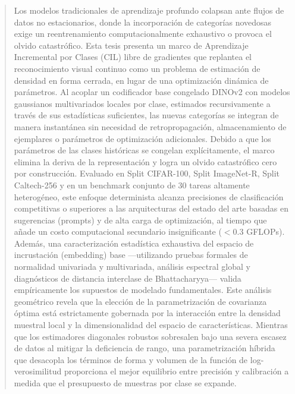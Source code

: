 \begin{abstract}
Los modelos tradicionales de aprendizaje profundo colapsan ante flujos de datos no estacionarios, donde la incorporación de categorías novedosas exige un reentrenamiento computacionalmente exhaustivo o provoca el olvido catastrófico. Esta tesis presenta un marco de Aprendizaje Incremental por Clases (CIL) libre de gradientes que replantea el reconocimiento visual continuo como un problema de estimación de densidad en forma cerrada, en lugar de una optimización dinámica de parámetros. Al acoplar un codificador base congelado DINOv2 con modelos gaussianos multivariados locales por clase, estimados recursivamente a través de sus estadísticas suficientes, las nuevas categorías se integran de manera instantánea sin necesidad de retropropagación, almacenamiento de ejemplares o parámetros de optimización adicionales. Debido a que los parámetros de las clases históricas se congelan explícitamente, el marco elimina la deriva de la representación y logra un olvido catastrófico cero por construcción. Evaluado en Split CIFAR-100, Split ImageNet-R, Split Caltech-256 y en un benchmark conjunto de 30 tareas altamente heterogéneo, este enfoque determinista alcanza precisiones de clasificación competitivas o superiores a las arquitecturas del estado del arte basadas en sugerencias (prompts) y de alta carga de optimización, al tiempo que añade un costo computacional secundario insignificante ($<0.3$ GFLOPs). Además, una caracterización estadística exhaustiva del espacio de incrustación (embedding) base —utilizando pruebas formales de normalidad univariada y multivariada, análisis espectral global y diagnósticos de distancia interclase de Bhattacharyya— valida empíricamente los supuestos de modelado fundamentales. Este análisis geométrico revela que la elección de la parametrización de covarianza óptima está estrictamente gobernada por la interacción entre la densidad muestral local y la dimensionalidad del espacio de características. Mientras que los estimadores diagonales robustos sobresalen bajo una severa escasez de datos al mitigar la deficiencia de rango, una parametrización híbrida que desacopla los términos de forma y volumen de la función de log-verosimilitud proporciona el mejor equilibrio entre precisión y calibración a medida que el presupuesto de muestras por clase se expande.
\end{abstract}


